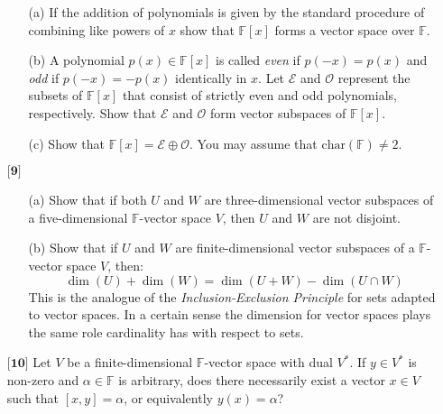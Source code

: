\documentclass[12pt]{article}
\begin{document}
\begin{itemize}
\begin{itemize}
    \vspace{.3cm}
    \item[(a)]
    If the addition of polynomials is given by the standard procedure of combining like powers of $x$ show that $\mathbb{F}[x]$ forms a vector space over $\mathbb{F}$.
    
    \vspace{.3cm}
    \item[(b)]
    A polynomial $p(x) \in \mathbb{F}[x]$ is called \textit{even} if $p(-x) = p(x)$ and \textit{odd} if $p(-x) = -p(x)$ identically in $x$. Let $\mathcal{E}$ and $\mathcal{O}$ represent the subsets of $\mathbb{F}[x]$ that consist of strictly even and odd polynomials, respectively. Show that $\mathcal{E}$ and $\mathcal{O}$ form vector subspaces of $\mathbb{F}[x]$. 
    
    \vspace{.3cm}
    \item[(c)]
    Show that $\mathbb{F}[x] = \mathcal{E} \oplus \mathcal{O}$. You may assume that $\text{char}(\mathbb{F}) \neq 2$. 
    
    \end{itemize} 
    
    \vspace{.5cm}
    
    \item[$\textbf{[9]}$]
    \begin{itemize}
    
    \item[(a)]
    Show that if both $U$ and $W$ are three-dimensional vector subspaces of a five-dimensional $\mathbb{F}$-vector space $V$, then $U$ and $W$ are not disjoint. 
    
    \vspace{.3cm}
    \item[(b)]
    Show that if $U$ and $W$ are finite-dimensional vector subspaces of a $\mathbb{F}$-vector space $V$, then:
    \begin{equation*}
    \dim(U) + \dim(W) = \dim(U + W) - \dim(U \cap W)
    \end{equation*}
    This is the analogue of the \textit{Inclusion-Exclusion Principle} for sets adapted to vector spaces. In a certain sense the dimension for vector spaces plays the same role cardinality has with respect to sets. 
    
    \end{itemize}
    
    \vspace{.5cm}
    
    \item[$\textbf{[10]}$]
    Let $V$ be a finite-dimensional $\mathbb{F}$-vector space with dual $V^*$. If $y \in V^*$ is non-zero and $\alpha \in \mathbb{F}$ is arbitrary, does there necessarily exist a vector $x \in V$ such that $[x,y] = \alpha$, or equivalently $y(x) = \alpha$?
    
    \end{itemize}
\end{document}
